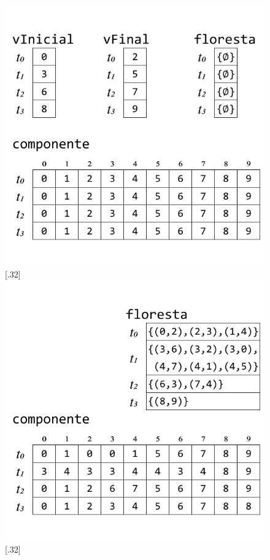 \documentclass[12pt]{article}
\begin{document}
\begin{figure}[h]
{		\includegraphics[width=\linewidth]{C.pdf}
	}
	\subcaptionbox{}[.32\textwidth]
	{
		\includegraphics[width=\linewidth]{D.pdf}
	}
	\subcaptionbox{}[.32\textwidth]
	{
}
\end{figure}
\end{document}
